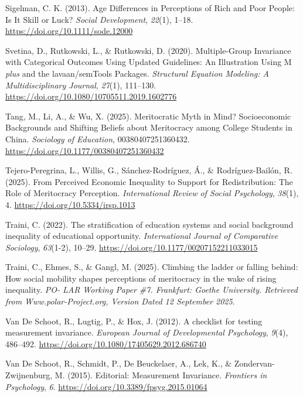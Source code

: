 \documentclass[
  13pt,
]{article}
\newlength{\cslhangindent}
\newenvironment{CSLReferences}[2] %
 {\begin{list}{}{%
  \setlength{\itemindent}{0pt}
  \setlength{\leftmargin}{0pt}
  \setlength{\parsep}{0pt}
  \ifodd #1
   \setlength{\leftmargin}{\cslhangindent}
   \setlength{\itemindent}{-1\cslhangindent}
  \fi
  \setlength{\itemsep}{#2\baselineskip}}}
 {\end{list}}
\begin{document}
\begin{CSLReferences}{1}{0}
Sigelman, C. K. (2013). Age {Differences} in {Perceptions} of {Rich} and
{Poor People}: {Is It Skill} or {Luck}? \emph{Social Development},
\emph{22}(1), 1--18. \url{https://doi.org/10.1111/sode.12000}

Svetina, D., Rutkowski, L., \& Rutkowski, D. (2020). Multiple-{Group
Invariance} with {Categorical Outcomes Using Updated Guidelines}: {An
Illustration Using M} {\emph{plus}} and the lavaan/{semTools Packages}.
\emph{Structural Equation Modeling: A Multidisciplinary Journal},
\emph{27}(1), 111--130.
\url{https://doi.org/10.1080/10705511.2019.1602776}

Tang, M., Li, A., \& Wu, X. (2025). Meritocratic {Myth} in {Mind}?
{Socioeconomic Backgrounds} and {Shifting Beliefs} about {Meritocracy}
among {College Students} in {China}. \emph{Sociology of Education},
00380407251360432. \url{https://doi.org/10.1177/00380407251360432}

Tejero-Peregrina, L., Willis, G., Sánchez-Rodríguez, Á., \&
Rodríguez-Bailón, R. (2025). From {Perceived Economic Inequality} to
{Support} for {Redistribution}: {The Role} of {Meritocracy Perception}.
\emph{International Review of Social Psychology}, \emph{38}(1), 4.
\url{https://doi.org/10.5334/irsp.1013}

Traini, C. (2022). The stratification of education systems and social
background inequality of educational opportunity. \emph{International
Journal of Comparative Sociology}, \emph{63}(1-2), 10--29.
\url{https://doi.org/10.1177/00207152211033015}

Traini, C., Ehmes, S., \& Gangl, M. (2025). Climbing the ladder or
falling behind: {How} social mobility shapes perceptions of meritocracy
in the wake of rising inequality. \emph{PO- LAR Working Paper \#7.
Frankfurt: Goethe University. Retrieved from Www.polar-Project.org,
Version Dated 12 September 2025}.

Van De Schoot, R., Lugtig, P., \& Hox, J. (2012). A checklist for
testing measurement invariance. \emph{European Journal of Developmental
Psychology}, \emph{9}(4), 486--492.
\url{https://doi.org/10.1080/17405629.2012.686740}

Van De Schoot, R., Schmidt, P., De Beuckelaer, A., Lek, K., \&
Zondervan-Zwijnenburg, M. (2015). Editorial: {Measurement Invariance}.
\emph{Frontiers in Psychology}, \emph{6}.
\url{https://doi.org/10.3389/fpsyg.2015.01064}


\end{CSLReferences}
\end{document}
